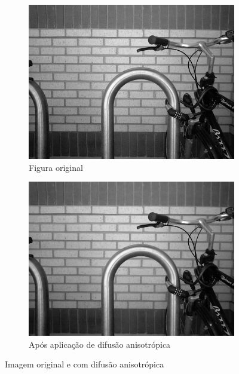 \documentclass[10pt,a4paper]{article}
\begin{document}
\begin{figure}[!ht]
    \centering
    \begin{subfigure}[ht]{0.45\textwidth}
        \includegraphics[width=\textwidth]{src.jpg}
        \caption{Figura original\cite{bike}}
        \label{fig:src}
    \end{subfigure}
    \qquad
    \begin{subfigure}[ht]{0.45\textwidth}
        \includegraphics[width=\textwidth]{aniso.jpg}
        \caption{\centering Após aplicação de difusão anisotrópica}
        \label{fig:aniso_diff}
    \end{subfigure}
    \caption{Imagem original e com difusão anisotrópica}
    \label{fig:aniso_diff_ex}
\end{figure}
\end{document}

